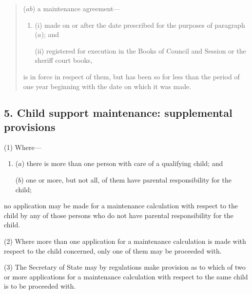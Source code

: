 \documentclass[a4paper]{article}
\begin{document}
{\begin{quotation}
\begin{enumerate}
($ab$) a
maintenance agreement---
\begin{enumerate}\item[]
(i)
made on or after the date prescribed for the purposes of paragraph ($a$);
and

(ii)
registered for execution in the Books of Council and Session or the
sheriff court books,
\end{enumerate}
is in force in respect of them, but has been so for less than the period of one year
beginning with the date on which it was made.
\end{enumerate}
\end{quotation}

}

\subsection{5. Child support
maintenance:
supplemental
provisions}

(1)
Where---
\begin{enumerate}\item[]
($a$)
there is more than one person with care of a qualifying child; and

($b$)
one or more, but not all, of them have parental responsibility for 
the child;
\end{enumerate}
no application may be made for a maintenance calculation
with respect to the child by any of those persons who do not have parental responsibility
for 
the child.

(2)
Where more than one application for a maintenance calculation
is made with respect to the child concerned, only one of them may be
proceeded with.

(3)
The Secretary of State may by regulations make provision as to which of
two or more applications for a maintenance calculation
with respect to the same child is to be proceeded with. 

\end{document}
